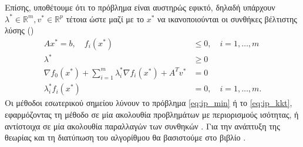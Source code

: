 Επίσης, υποθέτουμε ότι το πρόβλημα είναι αυστηρώς εφικτό, δηλαδή υπάρχουν
\( \lambda^* \in \mathbb{R}^m, v^* \in \mathbb{R}^p \) τέτοια ώστε μαζί με το
\(x^*\) να ικανοποιούνται οι συνθήκες βέλτιστης λύσης 
()
\begin{equation}\label{eq:ip_kkt}
    \begin{split}
        Ax^* = b, \quad f_i(x^*) &\leq 0,\quad i = 1, \dots, m\\
        \lambda^* &\geq 0\\
        \nabla f_0(x^*) + \sum_{i=1}^m \lambda_i^* \nabla f_i(x^*) + A^Tv^* & = 0 \\
        \lambda_i^*f_i(x^*) & = 0,\quad i = 1, \dots, m.
    \end{split}
\end{equation}
Οι μέθοδοι εσωτερικού σημείου λύνουν το πρόβλημα \eqref{eq:ip_min} ή το
\eqref{eq:ip_kkt}, εφαρμόζοντας τη μέθοδο  σε μία ακολουθία
προβλημάτων με περιορισμούς ισότητας, ή αντίστοιχα σε μία ακολουθία παραλλαγών
των συνθηκών . Για την ανάπτυξη της θεωρίας και τη διατύπωση του
αλγορίθμου θα βασιστούμε στο βιβλίο \cite{boyd2004convex}.

